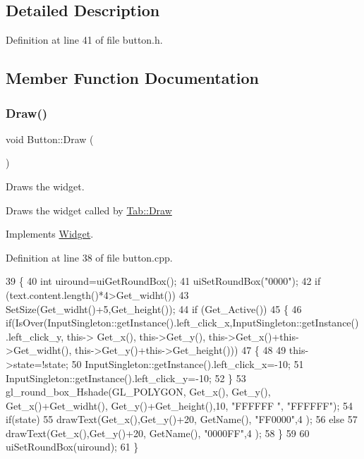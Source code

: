 \subsection{Detailed Description}


Definition at line 41 of file button.\+h.



\subsection{Member Function Documentation}
\mbox{\label{class_button_a6aaa2b781c933a296f41a8eca890eb1f}} 
\subsubsection{\texorpdfstring{Draw()}{Draw()}}
{\footnotesize\ttfamily void Button\+::\+Draw (\begin{DoxyParamCaption}{ }\end{DoxyParamCaption})\hspace{0.3cm}{\ttfamily [virtual]}}



Draws the widget. 

Draws the widget called by \hyperlink{class_tab_ae9db0c3ae8b0b75f7c5b3493b0267482}{Tab\+::\+Draw} 

Implements \hyperlink{class_widget_ac4c2063cd671468ad05d84cfe963c032}{Widget}.



Definition at line 38 of file button.\+cpp.


\begin{DoxyCode}
39 \{
40     \textcolor{keywordtype}{int} uiround=uiGetRoundBox();
41     uiSetRoundBox(\textcolor{stringliteral}{"0000"});
42     \textcolor{keywordflow}{if} (text.content.length()*4>Get\_widht())
43     SetSize(Get\_widht()+5,Get\_height());
44     \textcolor{keywordflow}{if} (Get\_Active())
45     \{
46     \textcolor{keywordflow}{if}(IsOver(InputSingleton::getInstance().left\_click\_x,InputSingleton::getInstance().left\_click\_y, this->
      Get\_x(), this->Get\_y(), this->Get\_x()+this->Get\_widht(), this->Get\_y()+this->Get\_height()))
47     \{
48         
49         this->state=!state;
50         InputSingleton::getInstance().left\_click\_x=-10;
51         InputSingleton::getInstance().left\_click\_y=-10;
52     \}
53     gl\_round\_box\_Hshade(GL\_POLYGON, Get\_x(), Get\_y(), Get\_x()+Get\_widht(), Get\_y()+Get\_height(),10, \textcolor{stringliteral}{"FFFFFF
      "},  \textcolor{stringliteral}{"FFFFFF"});
54     \textcolor{keywordflow}{if}(state)
55     drawText(Get\_x(),Get\_y()+20, GetName(), \textcolor{stringliteral}{"FF0000"},4 );
56     \textcolor{keywordflow}{else}
57         drawText(Get\_x(),Get\_y()+20, GetName(), \textcolor{stringliteral}{"0000FF"},4 );
58     \}
59     
60     uiSetRoundBox(uiround);
61 \}
\end{DoxyCode}
\mbox{\label{class_button_ad8e030c1c8846d43f3126047d4a3667f}} 
